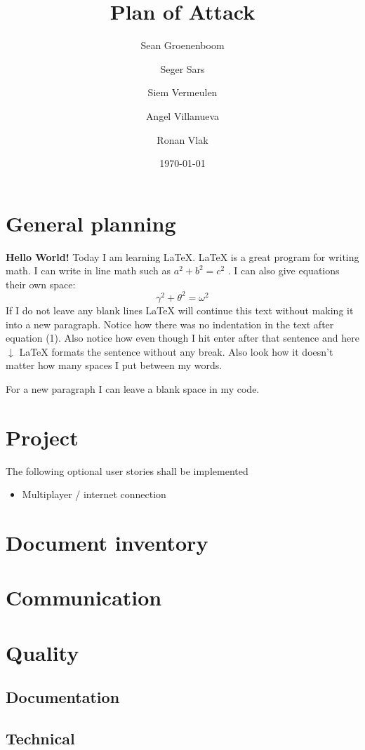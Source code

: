 \documentclass{article} %
\title{Plan of Attack} %
\author{Sean Groenenboom \and Seger Sars \and Siem Vermeulen \and Angel Villanueva \and Ronan Vlak} %
\date{\today} %
\begin{document}
    \maketitle %
    \newpage

    \section{General planning} %
    \textbf{Hello World!} Today I am learning \LaTeX. %
     \LaTeX{} is a great program for writing math. I can write in line math such as $a^2+b^2=c^2$ %
     . I can also give equations their own space: 
    \begin{equation} %
    \gamma^2+\theta^2=\omega^2
    \end{equation}
    If I do not leave any blank lines \LaTeX{} will continue  this text without making it into a new paragraph.  Notice how there was no indentation in the text after equation (1).  
    Also notice how even though I hit enter after that sentence and here $\downarrow$
     \LaTeX{} formats the sentence without any break.  Also   look  how      it   doesn't     matter          how    many  spaces     I put     between       my    words.
    
    For a new paragraph I can leave a blank space in my code. 
    \newpage

    \section{Project}
    The following optional user stories shall be implemented
    \begin{itemize}
        \item Multiplayer / internet connection
    \end{itemize}

    \section{Document inventory}
    \newpage

    \section{Communication}
    \newpage

    \section{Quality}
    \subsection{Documentation}

    \subsection{Technical}
    \newpage
\end{document}

